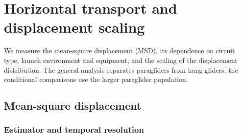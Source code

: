 \chapter{Horizontal transport and displacement scaling}
\label{ch:fixed-transport}






We measure the mean-square displacement (MSD), its dependence on circuit type,
launch environment and equipment, and the scaling of the displacement distribution.
The general analysis separates paragliders from hang gliders; the conditional
comparisons use the larger paraglider population.

\section{Mean-square displacement}
\label{sec:fixed-msd}
\subsection{Estimator and temporal resolution}

